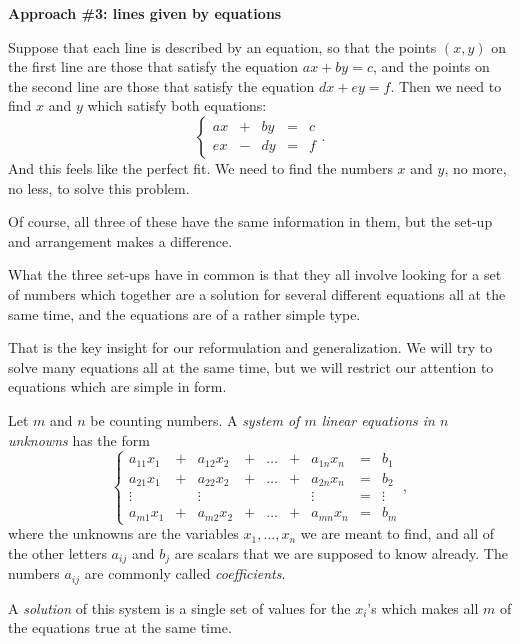 \documentclass[00-livre-main.tex]{subfiles}
\begin{document}
\noindent\textbf{Approach \#3: lines given by equations}

Suppose that each line is described by an equation, so that the points $(x,y)$ on the first line are those that satisfy the equation $ax+by=c$, and the points on the second line are those that satisfy the equation $dx+ey = f$. Then we need to find $x$ and $y$ which satisfy both equations:
\[
\left\{ \begin{array}{ccccc}
ax & + & by & = & c \\
ex & - & dy & = & f
\end{array}\right. .
\]
And this feels like the perfect fit. We need to find the numbers $x$ and $y$, no more, no less, to solve this problem.

Of course, all three of these have the same information in them, but the set-up and arrangement makes a difference.

What the three set-ups have in common is that they all involve looking for a set of numbers which together are a solution for several different equations all at the same time, and the equations are of a rather simple type. 

That is the key insight for our reformulation and generalization. We will try to solve many equations all at the same time, but we will restrict our attention to equations which are simple in form.


\begin{definition}
Let $m$ and $n$ be counting numbers. A \emph{system of $m$ linear equations in $n$ unknowns} has the form
\[
\left\{\begin{array}{rrrrrrrrr}
a_{11} x_1 & + & a_{12} x_2 & + & \dots & + & a_{1n} x_n & = & b_1 \\
a_{21} x_1 & + & a_{22} x_2 & + & \dots & + & a_{2n} x_n & = & b_2 \\
\vdots & & \vdots & & & & \vdots & = & \vdots \\
a_{m1} x_1 & + & a_{m2} x_2 & + & \dots & + & a_{mn} x_n & = & b_m 
\end{array}\right. ,
\]
where the unknowns are the variables $x_1, \ldots, x_n$ we are meant to find, and
all of the other letters $a_{ij}$ and $b_j$ are scalars that we are supposed to know already. The numbers $a_{ij}$ are commonly called \emph{coefficients}.

A \emph{solution} of this system is a single set of values for the $x_i$'s which makes 
all $m$ of the equations true at the same time.
\end{definition}
\end{document}
